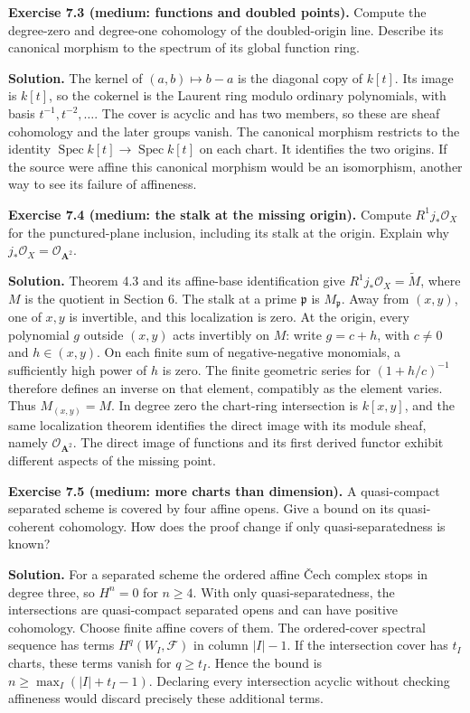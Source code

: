 \documentclass[11pt]{article}
\begin{document}
\textbf{Exercise 7.3 (medium: functions and doubled points).} Compute
the degree-zero and degree-one cohomology of the doubled-origin line.
Describe its canonical morphism to the spectrum of its global function
ring.

\textbf{Solution.} The kernel of \((a,b)\mapsto b-a\) is the diagonal
copy of \(k[t]\). Its image is \(k[t]\), so the cokernel is the Laurent
ring modulo ordinary polynomials, with basis \(t^{-1},t^{-2},\ldots\).
The cover is acyclic and has two members, so these are sheaf cohomology
and the later groups vanish. The canonical morphism restricts to the
identity \(\operatorname{Spec}k[t]\to\operatorname{Spec}k[t]\) on each
chart. It identifies the two origins. If the source were affine this
canonical morphism would be an isomorphism, another way to see its
failure of affineness.

\textbf{Exercise 7.4 (medium: the stalk at the missing origin).} Compute
\(R^1j_*\mathcal O_X\) for the punctured-plane inclusion, including its
stalk at the origin. Explain why
\(j_*\mathcal O_X=\mathcal O_{\mathbf A^2}\).

\textbf{Solution.} Theorem 4.3 and its affine-base identification give
\(R^1j_*\mathcal O_X=\widetilde M\), where \(M\) is the quotient in
Section 6. The stalk at a prime \(\mathfrak p\) is \(M_{\mathfrak p}\).
Away from \((x,y)\), one of \(x,y\) is invertible, and this localization
is zero. At the origin, every polynomial \(g\) outside \((x,y)\) acts
invertibly on \(M\): write \(g=c+h\), with \(c\ne0\) and \(h\in(x,y)\).
On each finite sum of negative-negative monomials, a sufficiently high
power of \(h\) is zero. The finite geometric series for \((1+h/c)^{-1}\)
therefore defines an inverse on that element, compatibly as the element
varies. Thus \(M_{(x,y)}=M\). In degree zero the chart-ring intersection
is \(k[x,y]\), and the same localization theorem identifies the direct
image with its module sheaf, namely \(\mathcal O_{\mathbf A^2}\). The
direct image of functions and its first derived functor exhibit
different aspects of the missing point.

\textbf{Exercise 7.5 (medium: more charts than dimension).} A
quasi-compact separated scheme is covered by four affine opens. Give a
bound on its quasi-coherent cohomology. How does the proof change if
only quasi-separatedness is known?

\textbf{Solution.} For a separated scheme the ordered affine Čech
complex stops in degree three, so \(H^n=0\) for \(n\ge4\). With only
quasi-separatedness, the intersections are quasi-compact separated opens
and can have positive cohomology. Choose finite affine covers of them.
The ordered-cover spectral sequence has terms \(H^q(W_I,\mathcal F)\) in
column \(|I|-1\). If the intersection cover has \(t_I\) charts, these
terms vanish for \(q\ge t_I\). Hence the bound is
\(n\ge\max_I(|I|+t_I-1)\). Declaring every intersection acyclic without
checking affineness would discard precisely these additional terms.
\end{document}
